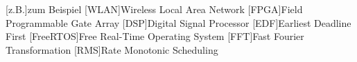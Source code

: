 \documentclass[../EDF Master Thesis.tex]{subfiles}
\begin{document}
    \begin{acronym}[abkuerzungen]
        [z.B.]{zum Beispiel}
        [WLAN]{Wireless Local Area Network}
        [FPGA]{Field Programmable Gate Array}
        [DSP]{Digital Signal Processor}
        [EDF]{Earliest Deadline First}
        [FreeRTOS]{Free Real-Time Operating System}
        [FFT]{Fast Fourier Transformation}
        [RMS]{Rate Monotonic Scheduling}
	\end{acronym}
\end{document}

